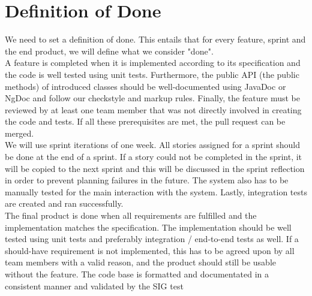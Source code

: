 \chapter{Definition of Done}
We need to set a definition of done.
This entails that for every feature, sprint and the end product, we will define what we consider "done".\\

A feature is completed when it is implemented according to its specification and the code is well tested using unit tests.
Furthermore, the public API (the public methods) of introduced classes should be well-documented using \gls{JavaDoc} or \gls{NgDoc} and follow our \gls{checkstyle} and markup rules.
Finally, the feature must be reviewed by at least one team member that was not directly involved in creating the code and tests.
If all these prerequisites are met, the pull request can be merged.\\

We will use sprint iterations of one week. All stories assigned for a sprint should be done at the end of a sprint.
If a story could not be completed in the sprint, it will be copied to the next sprint and this will be discussed in the sprint reflection in order to prevent planning failures in the future.
The system also has to be manually tested for the main interaction with the system. Lastly, integration tests are created and ran successfully.\\

The final product is done when all requirements are fulfilled and the implementation matches the specification. The implementation should be well tested using unit tests and preferably integration / end-to-end tests as well.
If a should-have requirement is not implemented, this has to be agreed upon by all team members with a valid reason, and the product should still be usable without the feature.
The code base is formatted and documentated in a consistent manner and validated by the \gls{SIG} test